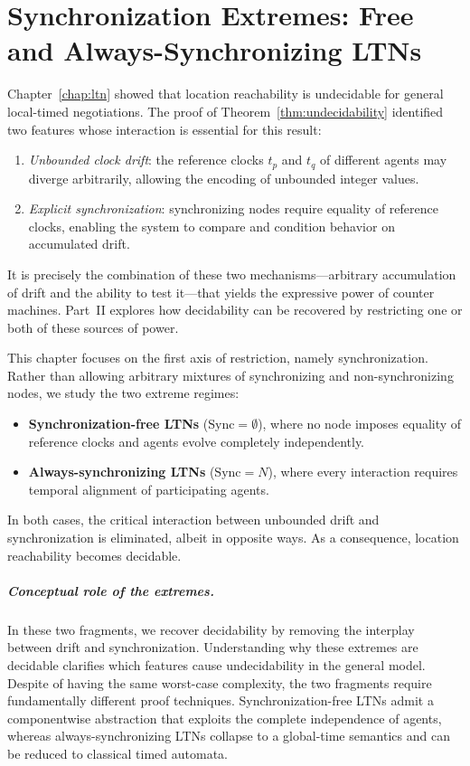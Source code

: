 
\chapter{Synchronization Extremes: Free and Always-Synchronizing LTNs}
\label{chap:fragments}

Chapter~\ref{chap:ltn} showed that location reachability is undecidable for general
local-timed negotiations. The proof of Theorem~\ref{thm:undecidability} identified
two features whose interaction is essential for this result:

\begin{enumerate}
\item \emph{Unbounded clock drift}: the reference clocks $t_p$ and $t_q$ of different
agents may diverge arbitrarily, allowing the encoding of unbounded integer values.
\item \emph{Explicit synchronization}: synchronizing nodes require equality of
reference clocks, enabling the system to compare and condition behavior on
accumulated drift.
\end{enumerate}

It is precisely the combination of these two mechanisms—arbitrary accumulation
of drift and the ability to test it—that yields the expressive power of counter
machines. Part~II explores how decidability can be recovered by restricting one
or both of these sources of power.

This chapter focuses on the first axis of restriction, namely synchronization.
Rather than allowing arbitrary mixtures of synchronizing and non-synchronizing
nodes, we study the two extreme regimes:
\begin{itemize}
\item \textbf{Synchronization-free LTNs} ($\text{Sync} = \emptyset$), where no node
imposes equality of reference clocks and agents evolve completely independently.
\item \textbf{Always-synchronizing LTNs} ($\text{Sync} = N$), where every interaction
requires temporal alignment of participating agents.
\end{itemize}

In both cases, the critical interaction between unbounded drift and synchronization
is eliminated, albeit in opposite ways. As a consequence, location reachability
becomes decidable.

\paragraph{Conceptual role of the extremes.}
In these two fragments, we recover decidability by removing the interplay between drift and synchronization. Understanding why these extremes are decidable clarifies which features cause undecidability in the general model.
Despite of having the same worst-case complexity, the two fragments require
fundamentally different proof techniques. Synchronization-free LTNs admit a
componentwise abstraction that exploits the complete independence of agents,
whereas always-synchronizing LTNs collapse to a global-time semantics and can be
reduced to classical timed automata.

